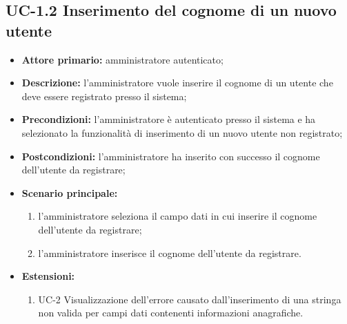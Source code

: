 \subsection{UC-1.2 Inserimento del cognome di un nuovo utente}
\begin{itemize}
	\item \textbf{Attore primario:} amministratore autenticato;

	\item \textbf{Descrizione:} l'amministratore vuole inserire il cognome di un utente che deve essere registrato presso il sistema;

	\item \textbf{Precondizioni:} l'amministratore è autenticato presso il sistema e ha selezionato la funzionalità di inserimento di un nuovo utente non registrato;

	\item \textbf{Postcondizioni:} l'amministratore ha inserito con successo il cognome dell'utente da registrare;

	\item \textbf{Scenario principale:}
	      \begin{enumerate}
		      \item l'amministratore seleziona il campo dati in cui inserire il cognome dell'utente da registrare;
		      \item l'amministratore inserisce il cognome dell'utente da registrare.
	      \end{enumerate}
	\item \textbf{Estensioni:}
	      \begin{enumerate}
		      \item UC-2 Visualizzazione dell'errore causato dall'inserimento di una stringa non valida per campi dati contenenti informazioni anagrafiche.
	      \end{enumerate}
\end{itemize}
